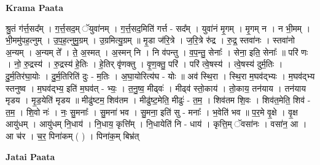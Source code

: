 \documentclass[17pt]{extarticle}
\begin{document}
\textbf{Krama Paata} \newline

श्रु॒तं ग॑र्त्त॒सद᳚म् । ग॒र्त्त॒सद॒म् ॅयुवा॑नम् । ग॒र्त्त॒सद॒मिति॑ गर्त्त - सद᳚म् । युवा॑नं मृ॒गम् । मृ॒गम् न । न भी॒मम् । भी॒ममु॑पह॒त्नुम् । उ॒प॒ह॒त्नुमु॒ग्रम् । उ॒ग्रमित्यु॒ग्रम् ॥ मृ॒डा ज॑रि॒त्रे । ज॒रि॒त्रे रु॑द्र । रु॒द्र॒ स्तवा॑नः । स्तवा॑नो अ॒न्यम् । अ॒न्यम् ते᳚ । ते॒ अ॒स्मत् । अ॒स्मन् नि । नि व॑पन्तु । व॒प॒न्तु॒ सेनाः᳚ । सेना॒ इति॒ सेनाः᳚ ॥ परि॑ णः । नो॒ रु॒द्रस्य॑ । रु॒द्रस्य॑ हे॒तिः । हे॒तिर् वृ॑णक्तु । वृ॒ण॒क्तु॒ परि॑ । परि॑ त्वे॒षस्य॑ । त्वे॒षस्य॑ दुर्म॒तिः । दु॒र्म॒तिर॑घा॒योः । दु॒र्म॒तिरिति॑ दुः - म॒तिः । अ॒घा॒योरित्य॑घ - योः ॥ अव॑ स्थि॒रा । स्थि॒रा म॒घव॑द्भ्यः । म॒घव॑द्भ्य स्तनुष्व । म॒घव॑द्भ्य॒ इति॑ म॒घव॑त् - भ्यः॒ । त॒नु॒ष्व॒ मीढ्वः॑ । मीढ्व॑ स्तो॒काय॑ । तो॒काय॒ तन॑याय । तन॑याय मृडय । मृ॒ड॒येति॑ मृडय ॥ मीढु॑ष्टम॒ शिव॑तम । मीढु॑ष्ट॒मेति॒ मीढुः॑ - त॒म॒ । शिव॑तम शि॒वः । शिव॑त॒मेति॒ शिव॑ - त॒म॒ । शि॒वो नः॑ । नः॒ सु॒मनाः᳚ । सु॒मना॑ भव । सु॒मना॒ इति॑ सु - मनाः᳚ । भ॒वेति॑ भव ॥ प॒र॒मे वृ॒क्षे । वृ॒क्ष आयु॑धम् । आयु॑धम् नि॒धाय॑ । नि॒धाय॒ कृत्ति᳚म् । नि॒धायेति॑ नि - धाय॑ । कृत्ति॒म् ॅवसा॑नः । वसा॑न॒ आ । आ च॑र । च॒र॒ पिना॑कम् ( ) । पिना॑क॒म् बिभ्र॑त् \newline

\textbf{Jatai Paata} \newline
\end{document}
